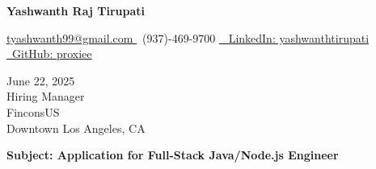 \documentclass[letterpaper,11pt]{article}
\begin{document}
\begin{center}
    \textbf{\LARGE Yashwanth Raj Tirupati}
    \vspace{4pt}
    
    \small
    \href{mailto:tyashwanth99@gmail.com}{ tyashwanth99@gmail.com }\textbar
     ~(937)-469-9700 \textbar
    \href{https://linkedin.com/in/yashwanthtirupati}{~ LinkedIn: yashwanthtirupati }\textbar 
    \href{https://github.com/proxiee}{~GitHub: proxiee }
\end{center}

\vspace{20pt}

\begin{flushleft}
    June 22, 2025 \\
    \vspace{12pt}
    Hiring Manager \\
    FinconsUS \\
    Downtown Los Angeles, CA \\
\end{flushleft}


\begin{flushleft}
\textbf{Subject: Application for Full-Stack Java/Node.js Engineer}
\end{flushleft}


\end{document}
